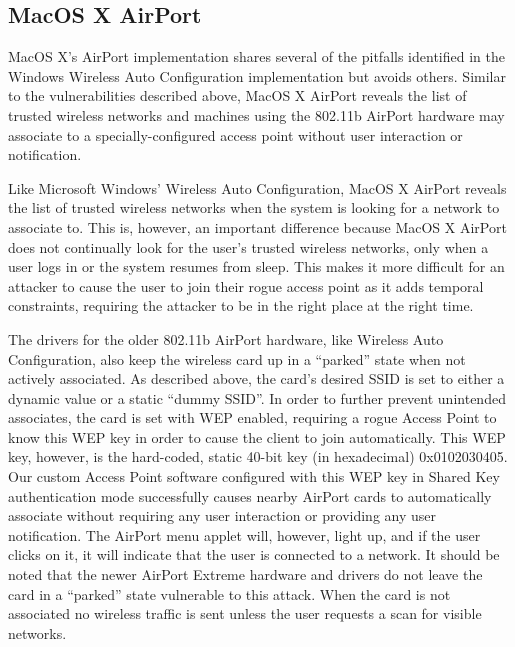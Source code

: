 \documentclass[10pt,twocolumn]{article}
\begin{document}
\subsection{MacOS X AirPort}


MacOS X's AirPort implementation shares several of the pitfalls
identified in the Windows Wireless Auto Configuration implementation
but avoids others.  Similar to the vulnerabilities described above,
MacOS X AirPort reveals the list of trusted wireless networks and
machines using the 802.11b AirPort hardware may associate to a
specially-configured access point without user interaction or
notification.

Like Microsoft Windows' Wireless Auto Configuration, MacOS X AirPort
reveals the list of trusted wireless networks when the system is
looking for a network to associate to.  This is, however, an important
difference because MacOS X AirPort does not continually look for the
user's trusted wireless networks, only when a user logs in or the
system resumes from sleep.  This makes it more difficult for an
attacker to cause the user to join their rogue access point as it adds
temporal constraints, requiring the attacker to be in the right place
at the right time.

The drivers for the older 802.11b AirPort hardware, like Wireless Auto
Configuration, also keep the wireless card up in a ``parked'' state
when not actively associated.  As described above, the card's desired
SSID is set to either a dynamic value or a static ``dummy SSID''.  In
order to further prevent unintended associates, the card is set with
WEP enabled, requiring a rogue Access Point to know this WEP key in
order to cause the client to join automatically.  This WEP key,
however, is the hard-coded, static 40-bit key (in hexadecimal)
0x0102030405.  Our custom Access Point software configured with this
WEP key in Shared Key authentication mode successfully causes nearby
AirPort cards to automatically associate without requiring any user
interaction or providing any user notification.  The AirPort menu
applet will, however, light up, and if the user clicks on it, it will
indicate that the user is connected to a network.  It should be noted
that the newer AirPort Extreme hardware and drivers do not leave the
card in a ``parked'' state vulnerable to this attack.  When the card is
not associated no wireless traffic is sent unless the user requests a
scan for visible networks.
\end{document}
